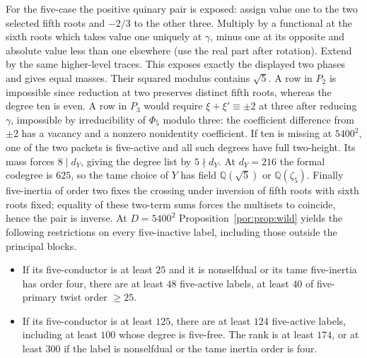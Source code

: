 \documentclass[11pt,a4paper]{article}
\numberwithin{equation}{section}
\theoremstyle{remark}
\newcommand{\QQ}{\mathbb Q}
\begin{document}
For the five-case the positive quinary pair is exposed: assign value one to the two selected fifth roots and $-2/3$ to the other three. Multiply by a functional at the sixth roots which takes value one uniquely at $\gamma$, minus one at its opposite and absolute value less than one elsewhere (use the real part after rotation). Extend by the same higher-level traces. This exposes exactly the displayed two phases and gives equal masses. Their squared modulus contains $\sqrt5$. A row in $P_2$ is impossible since reduction at two preserves distinct fifth roots, whereas the degree ten is even. A row in $P_3$ would require $\xi+\xi'\equiv\pm2$ at three after reducing $\gamma$, impossible by irreducibility of $\Phi_5$ modulo three: the coefficient difference from $\pm2$ has a vacancy and a nonzero nonidentity coefficient. If ten is missing at $5400^2$, one of the two packets is five-active and all such degrees have full two-height. Its mass forces $8\mid d_Y$, giving the degree list by $5\nmid d_Y$. At $d_Y=216$ the formal codegree is $625$, so the tame choice of $Y$ has field $\QQ(\sqrt5)$ or $\QQ(\zeta_5)$. Finally five-inertia of order two fixes the crossing under inversion of fifth roots with sixth roots fixed; equality of these two-term sums forces the multisets to coincide, hence the pair is inverse.
At $D=5400^2$ Proposition~\ref{por:prop:wild} yields the following restrictions on every five-inactive label, including those outside the principal blocks.
\begin{itemize}
\item If its five-conductor is at least $25$ and it is nonselfdual or its tame five-inertia has order four, there are at least $48$ five-active labels, at least $40$ of five-primary twist order $\ge25$.
\item If its five-conductor is at least $125$, there are at least $124$ five-active labels, including at least $100$ whose degree is five-free. The rank is at least $174$, or at least $300$ if the label is nonselfdual or the tame inertia order is four.
\end{itemize}
\end{document}
